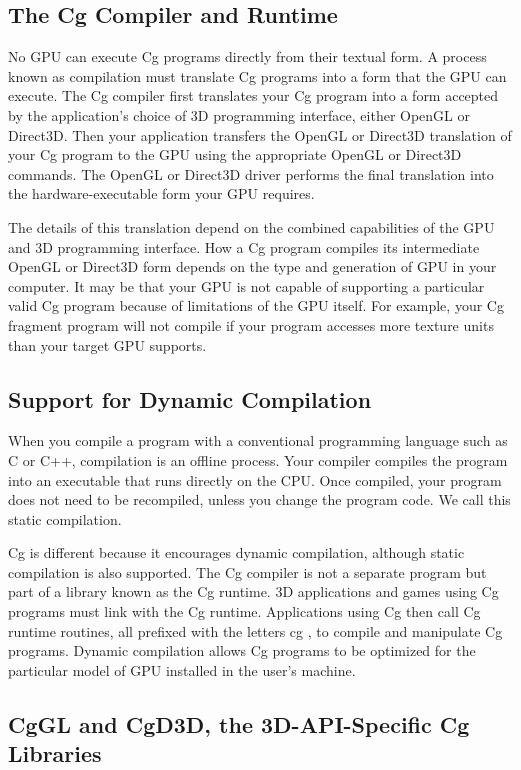 \documentclass[../main.tex]{subfiles}
\begin{document}
\subsection{The Cg Compiler and Runtime}

No GPU can execute Cg programs directly from their textual form. A process known as compilation must translate Cg programs into a form that the GPU can execute. The Cg compiler first translates your Cg program into a form accepted by the application's choice of 3D programming interface, either OpenGL or Direct3D. Then your application transfers the OpenGL or Direct3D translation of your Cg program to the GPU using the appropriate OpenGL or Direct3D commands. The OpenGL or Direct3D driver performs the final translation into the hardware-executable form your GPU requires.

The details of this translation depend on the combined capabilities of the GPU and 3D programming interface. How a Cg program compiles its intermediate OpenGL or Direct3D form depends on the type and generation of GPU in your computer. It may be that your GPU is not capable of supporting a particular valid Cg program because of limitations of the GPU itself. For example, your Cg fragment program will not compile if your program accesses more texture units than your target GPU supports.

\subsection*{Support for Dynamic Compilation}

When you compile a program with a conventional programming language such as C or C++, compilation is an offline process. Your compiler compiles the program into an executable that runs directly on the CPU. Once compiled, your program does not need to be recompiled, unless you change the program code. We call this static compilation.

Cg is different because it encourages dynamic compilation, although static compilation is also supported. The Cg compiler is not a separate program but part of a library known as the Cg runtime. 3D applications and games using Cg programs must link with the Cg runtime. Applications using Cg then call Cg runtime routines, all prefixed with the letters cg , to compile and manipulate Cg programs. Dynamic compilation allows Cg programs to be optimized for the particular model of GPU installed in the user's machine.

\subsection*{CgGL and CgD3D, the 3D-API-Specific Cg Libraries}
\end{document}
